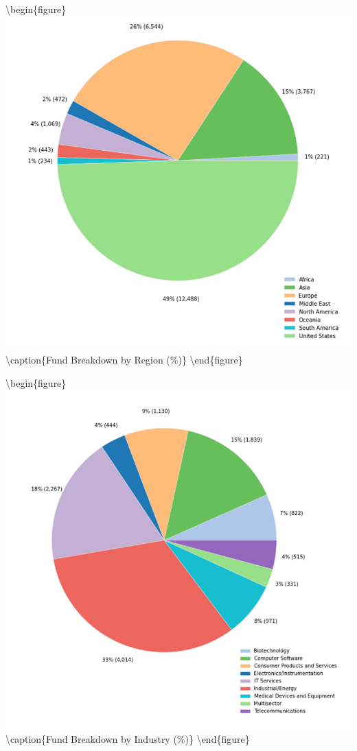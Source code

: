\documentclass[
]{WileySix}
\begin{document}
\textbackslash begin\{figure\}
\includegraphics[width=1\linewidth]{./assets/pcri/pcrifigurea2web} \textbackslash caption\{Fund Breakdown by Region (\%)\}\label{fig:pcrifigurea2}
\textbackslash end\{figure\}

\textbackslash begin\{figure\}
\includegraphics[width=1\linewidth]{./assets/pcri/pcrifigurea3web} \textbackslash caption\{Fund Breakdown by Industry (\%)\}\label{fig:pcrifigurea3}
\textbackslash end\{figure\}
\end{document}

